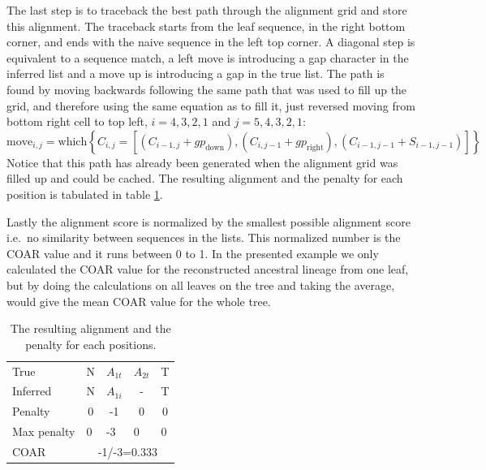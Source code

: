 The last step is to traceback the best path through the alignment grid and store this alignment.
The traceback starts from the leaf sequence, in the right bottom corner, and ends with the naive sequence in the left top corner.
A diagonal step is equivalent to a sequence match, a left move is introducing a gap character in the inferred list and a move up is introducing a gap in the true list.
The path is found by moving backwards following the same path that was used to fill up the grid, and therefore using the same equation as to fill it, just reversed moving from bottom right cell to top left, $i=4,3,2,1$ and $j=5,4,3,2,1$:
$$
\text{move}_{i,j} = \text{which}\left\{ C_{i,j} = [(C_{i-1,j} + gp_{\text{down}}), (C_{i,j-1} + gp_{\text{right}}), (C_{i-1,j-1 } + S_{i-1,j-1})] \right\}
$$
Notice that this path has already been generated when the alignment grid was filled up and could be cached.
The resulting alignment and the penalty for each position is tabulated in table \ref{NW_final_alignment}.

\clearpage
Lastly the alignment score is normalized by the smallest possible alignment score i.e.\ no similarity between sequences in the lists.
This normalized number is the COAR value and it runs between 0 to 1.
In the presented example we only calculated the COAR value for the reconstructed ancestral lineage from one leaf, but by doing the calculations on all leaves on the tree and taking the average, would give the mean COAR value for the whole tree.
\begin{table}[ht!]
\centering
\begin{tabular}{|lcccc|}
\hline
\multicolumn{1}{|l|}{True}     & \multicolumn{1}{c|}{N} & \multicolumn{1}{c|}{$A_{1t}$} & \multicolumn{1}{c|}{$A_{2t}$} & T                      \\
\multicolumn{1}{|l|}{Inferred} & \multicolumn{1}{c|}{N} & \multicolumn{1}{c|}{$A_{1i}$} & \multicolumn{1}{c|}{-}        & T                      \\ \hline
Penalty                        & 0                      & -1                             & 0                           & 0                      \\ \hline
Max penalty                    & \multicolumn{1}{l}{0}  & \multicolumn{1}{l}{-3}        & \multicolumn{1}{l}{0}       & \multicolumn{1}{l|}{0} \\ \hline
COAR                           & \multicolumn{4}{c|}{-1/-3=0.333}                                                                                    \\ \hline
\end{tabular}
    \caption{
         \label{NW_final_alignment}
             The resulting alignment and the penalty for each positions.
             }
\end{table}





